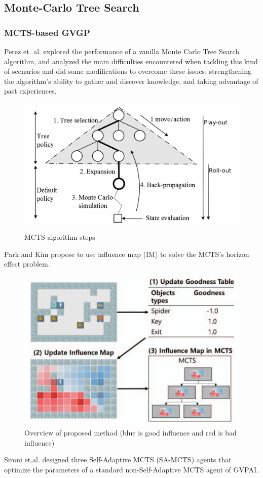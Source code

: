 \documentclass{beamer}
\begin{document}
\subsection{Monte-Carlo Tree Search}
\begin{frame}[allowframebreaks]
\frametitle{MCTS-based GVGP}
Perez et. al. \cite{8} explored the performance of a vanilla Monte Carlo Tree Search algorithm, and analyzed the main difficulties encountered when tackling this kind of scenarios and did some modifications to overcome these issues, strengthening the algorithm's ability to gather and discover knowledge, and taking advantage of past experiences.

\begin{figure}[c]
  \includegraphics[width=0.6\linewidth]{figures/mctskb}
  \caption{ MCTS algorithm steps }
\end{figure}

Park and Kim\cite{9} propose to use influence map (IM) to solve
the MCTS’s horizon effect problem.

\begin{figure}[c]
  \includegraphics[width=0.6\linewidth]{figures/kim}
  \caption{ Overview of proposed method (blue is good influence and red is bad influence) }
\end{figure}

Sironi et.al.\cite{10} designed three Self-Adaptive MCTS (SA-MCTS) agents that optimize the parameters of a standard non-Self-Adaptive MCTS agent of GVPAI. 


\end{frame}
\end{document}
